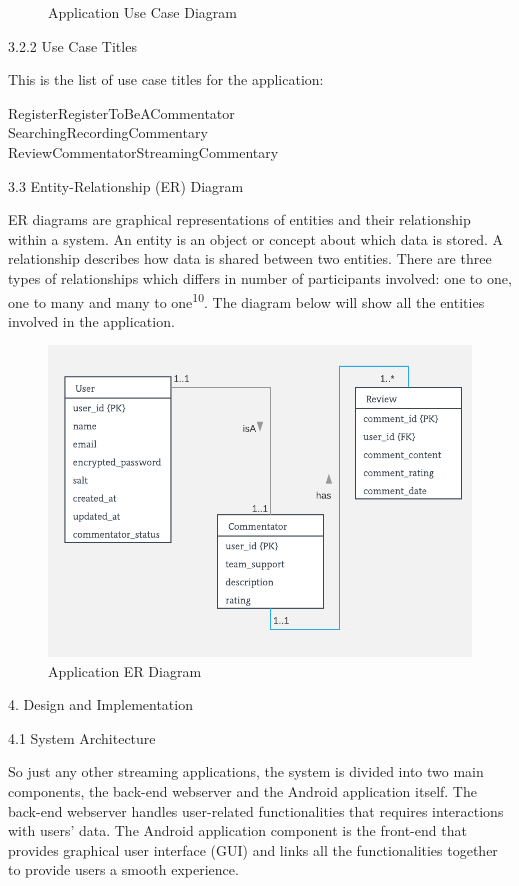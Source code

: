 \documentclass{article}
\begin{document}
\begin{flushleft}
\begin{figure}[H]
    \caption{Application Use Case Diagram}
    \label{fig:use-case-diagram}
\end{figure}
{\large 3.2.2 Use Case Titles}\par
This is the list of use case titles for the application:\par
\noindent Register\hfill RegisterToBeACommentator\\
\noindent Searching\hfill RecordingCommentary\\
\noindent ReviewCommentator\hfill StreamingCommentary\par
{\Large 3.3 Entity-Relationship (ER) Diagram}\par
ER diagrams are graphical representations of entities and their relationship within a system. An entity is an object or concept about which data is stored. A relationship describes how data is shared between two entities.  There are three types of relationships which differs in number of participants involved: one to one, one to many and many to one\textsuperscript{10}. The diagram below will show all the entities involved in the application.\par
\begin{figure}[H]
	\centering
	\includegraphics[width=14cm]{er-diagram}
	\caption{Application ER Diagram}
	\label{fig:er-diagram}
\end{figure}
{\huge 4. Design and Implementation}\par
{\Large 4.1 System Architecture}\par
So just any other streaming applications, the system is divided into two main components, the back-end webserver and the Android application itself. The back-end webserver handles user-related functionalities that requires interactions with users' data. The Android application component is the front-end that provides graphical user interface (GUI) and links all the functionalities together to provide users a smooth experience.\par

\end{flushleft}
\end{document}
